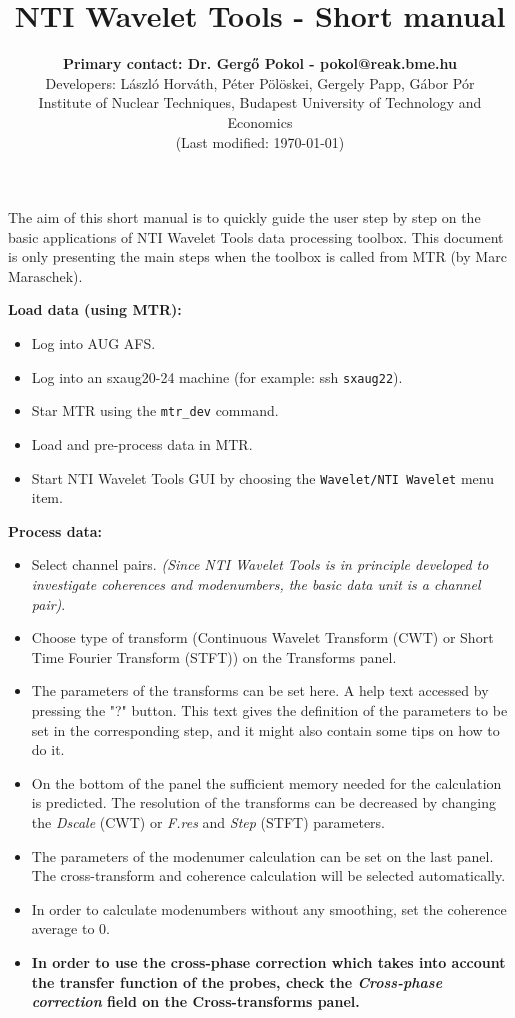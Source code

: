 \documentclass[12pt]{article}
\title{\vspace{-2.5 cm}\textbf{NTI Wavelet Tools - Short manual}}
\author{
\textbf{Primary contact: Dr. Gerg\H{o} Pokol - pokol@reak.bme.hu}\\
{\small Developers: László Horváth, Péter Pölöskei, Gergely Papp, Gábor Pór}\\
{\small Institute of Nuclear Techniques, Budapest University of Technology and Economics}\\
\vspace{0.6 cm}
{\small(Last modified: \today)}
}
\date{}
\begin{document}
\maketitle
\thispagestyle{empty}

\vspace{-1.5 cm}

The aim of this short manual is to quickly guide the user step by step on the basic applications of NTI Wavelet Tools data processing toolbox. This document is only presenting the main steps when the toolbox is called from MTR (by Marc
Maraschek).

\vspace{0.3 cm}

\noindent\textbf{Load data (using MTR):}\vspace{-0.3 cm}
\begin{itemize}
\setlength{\itemsep}{-5pt}
  \item Log into AUG AFS.
  \item Log into an sxaug20-24 machine (for example: ssh \verb|sxaug22|).
  \item Star MTR using the \verb|mtr_dev| command.
  \item Load and pre-process data in MTR.
  \item Start NTI Wavelet Tools GUI by choosing the \verb|Wavelet/NTI Wavelet| menu item.
\end{itemize}

\vspace{-0.3 cm}\noindent\textbf{Process data:}\vspace{-0.3 cm}
\begin{itemize}
\setlength{\itemsep}{-4pt}
  \item Select channel pairs. \textit{(Since NTI Wavelet Tools is in principle developed to investigate coherences and modenumbers, the basic data unit is a channel pair)}.
  \item Choose type of transform (Continuous Wavelet Transform (CWT) or Short Time Fourier Transform (STFT)) on the Transforms panel.
  \item The parameters of the transforms can be set here. A help text accessed by pressing the "?" button. This text gives the definition of the parameters to be set in the corresponding step, and it might also contain some tips on how to do it.
  \item On the bottom of the panel the sufficient memory needed for the calculation is predicted. The resolution of the transforms can be decreased by changing the \textit{Dscale} (CWT) or \textit{F.res} and \textit{Step} (STFT) parameters.
  \item The parameters of the modenumer calculation can be set on the last panel. The cross-transform and coherence calculation will be selected automatically.
  \item In order to calculate modenumbers without any smoothing, set the coherence average to 0.
  \item \textbf{In order to use the cross-phase correction which takes into account the transfer function of the probes, check the \textit{Cross-phase correction} field on the Cross-transforms panel.}
\end{itemize}
\end{document}
